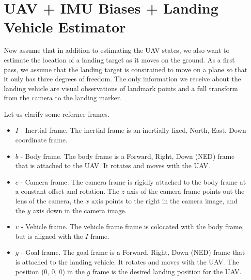 
\section{UAV + IMU Biases + Landing Vehicle Estimator}
Now assume that in addition to estimating the UAV states, we also want to
estimate the location of a landing target as it moves on the ground. As a first
pass, we assume that the landing target is constrained to move on a plane so
that it only has three degrees of freedom. The only information we receive about
the landing vehicle are visual observations of landmark points and a full
transform from the camera to the landing marker.

Let us clarify some refernce frames.
\begin{itemize}
  \item $I$ - Inertial frame. The inertial frame is an inertially fixed, North,
    East, Down coordinate frame.
  \item $b$ - Body frame. The body frame is a Forward, Right, Down (NED) frame
    that is attached to the UAV. It rotates and moves with the UAV.
  \item $c$ - Camera frame. The camera frame is rigidly attached to the body
    frame at a constant offset and rotation. The $z$ axis of the camera frame
    points out the lens of the camera, the $x$ axis points to the right in the
    camera image, and the $y$ axis down in the camera image.
  \item $v$ - Vehicle frame. The vehicle frame frame is colocated with the body
    frame, but is aligned with the $I$ frame.
  \item $g$ - Goal frame. The goal frame is a Forward, Right, Down (NED) frame
    that is attached to the landing vehicle. It rotates and moves with the UAV.
    The position (0, 0, 0) in the $g$ frame is the desired landing position for
    the UAV.
\end{itemize}

